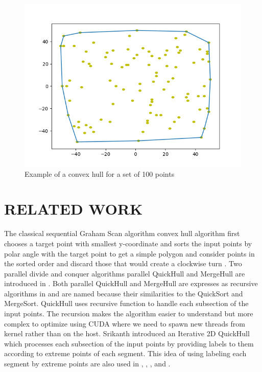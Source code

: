 \documentclass{article}
\begin{document}
\begin{figure}[h]
\centering
\includegraphics[scale=.4]{images/100_point_polygon.PNG}
\caption{Example of a convex hull for a set of 100 points}
\label{fig:example}
\end{figure}

\section{RELATED WORK}
The classical sequential Graham Scan algorithm convex hull algorithm \cite{Graham_72} first chooses a target point with smallest y-coordinate and sorts the input points by polar angle with the target point to get a simple polygon and consider points in the sorted order and discard those that would create a clockwise turn \cite{Graham_72}. Two parallel divide and conquer algorithms parallel QuickHull and MergeHull are introduced in \cite{blelloch1996parallel}. Both parallel QuickHull and MergeHull are expresses as recursive algorithms in \cite{blelloch1996parallel} and are named because their similarities to the QuickSort and MergeSort. QuickHull uses recursive function to handle each subsection of the input points. The recursion makes the algorithm easier to understand but more complex to optimize using CUDA where we need to spawn new threads from kernel rather than on the host. Srikanth \cite{srikanth2009parallelizing} introduced an Iterative 2D QuickHull which processes each subsection of the input points by providing labels to them according to extreme points of each segment. This idea of using labeling each segment by extreme points are also used in \cite{srungarapu2011fast}, \cite{tzeng2012finding}, \cite{Mei_2016}, and \cite{zhang2015novel}.
\end{document}
